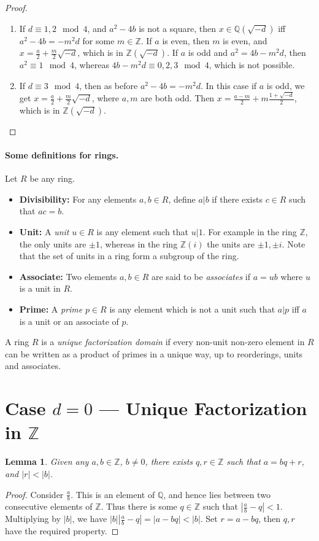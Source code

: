 \documentclass[12pt]{article}
\newcommand{\ints}{{\mathbb{Z}}}
\newcommand{\qf}{{\mathbb{Q}}}
\newtheorem{lemma}[thm]{Lemma}
\begin{document}
\begin{proof}
\begin{itemize}
\begin{enumerate}
\item If $d \equiv 1, 2 \mod 4$, and $a^2 - 4b$ is not a square, then $x \in \qf(\sqrt{-d})$ iff $a^2 - 4b = -m^2d$ for some $m \in \ints$.  If $a$ is even, then $m$ is even, and $x = \frac{a}{2} + \frac{m}{2}\sqrt{-d}$, which is in $\ints(\sqrt{-d})$. If $a$ is odd and $a^2 = 4b - m^2d$, then $a^2 \equiv 1 \mod 4$, whereas $4b - m^2d \equiv 0, 2, 3 \mod 4$, which is not possible.
\item If $d \equiv 3 \mod 4$, then as before $a^2 - 4b = -m^2d$. In this case if $a$ is odd, we get $x = \frac{a}{2} + \frac{m}{2}\sqrt{-d}$, where $a, m$ are both odd.  Then $x = \frac{a-m}{2} + m\frac{1 + \sqrt{-d}}{2}$, which is in $\ints(\sqrt{-d})$.
\end{enumerate}
\end{itemize}
\end{proof}

\paragraph{Some definitions for rings.} Let $R$ be any ring.
\begin{itemize}
\item {\bf Divisibility:} For any elements $a, b \in R$, define $a | b$ if there exists $c \in R$ such that $ac = b$. 
\item {\bf Unit:} A {\em unit} $u \in R$ is any element such that $u | 1$. For example in the ring $\ints$, the only units are $\pm 1$, whereas in the ring $\ints(i)$ the units are $\pm 1, \pm i$.  Note that the set of units in a ring form a subgroup of the ring. 
\item {\bf Associate:} Two elements $a, b \in R$ are said to be {\em associates} if $a = ub$ where $u$ is a unit in $R$. 
\item {\bf Prime:} A {\em prime} $p \in R$ is any element which is not a unit such that $a | p$ iff $a$ is a unit or an associate of $p$.
\end{itemize}

A ring $R$ is a {\em unique factorization domain} if every non-unit non-zero element in $R$ can be written as a product of primes in a unique way, up to reorderings, units and associates.

\section{Case $d = 0$ --- Unique Factorization in $\ints$}

\begin{lemma}\label{lem:div-ints}
Given any $a, b \in \ints$, $b \neq 0$, there exists $q, r \in \ints$ such that $a = bq + r$, and $|r| < |b|$.
\end{lemma}
\begin{proof}
Consider $\frac{a}{b}$. This is an element of $\qf$, and hence lies between two consecutive elements of $\ints$. Thus there is some $q \in \ints$ such that $| \frac{a}{b} - q| < 1$. Multiplying by $|b|$, we have $|b|  |\frac{a}{b} - q|  = |a - bq| < |b|$. Set $r = a - bq$, then $q, r$ have the required property.
\end{proof}
\end{document}
